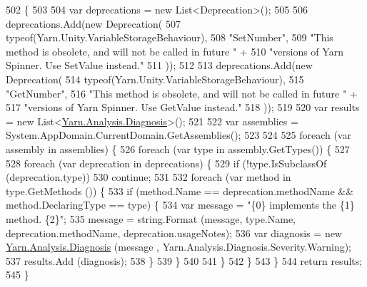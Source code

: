 \begin{DoxyCode}
502         \{
503 
504             var deprecations = \textcolor{keyword}{new} List<Deprecation>();
505 
506             deprecations.Add(\textcolor{keyword}{new} Deprecation(
507                 typeof(Yarn.Unity.VariableStorageBehaviour),
508                 \textcolor{stringliteral}{"SetNumber"},
509                 \textcolor{stringliteral}{"This method is obsolete, and will not be called in future "} +
510                 \textcolor{stringliteral}{"versions of Yarn Spinner. Use SetValue instead."}
511             ));
512 
513             deprecations.Add(\textcolor{keyword}{new} Deprecation(
514                 typeof(Yarn.Unity.VariableStorageBehaviour),
515                 \textcolor{stringliteral}{"GetNumber"},
516                 \textcolor{stringliteral}{"This method is obsolete, and will not be called in future "} +
517                 \textcolor{stringliteral}{"versions of Yarn Spinner. Use GetValue instead."}
518             ));
519 
520             var results = \textcolor{keyword}{new} List<\hyperlink{a00071}{Yarn.Analysis.Diagnosis}>();
521 
522             var assemblies = System.AppDomain.CurrentDomain.GetAssemblies();
523 
524 
525             \textcolor{keywordflow}{foreach} (var assembly \textcolor{keywordflow}{in} assemblies) \{
526                 \textcolor{keywordflow}{foreach} (var type \textcolor{keywordflow}{in} assembly.GetTypes()) \{
527 
528                     \textcolor{keywordflow}{foreach} (var deprecation \textcolor{keywordflow}{in} deprecations) \{
529                         \textcolor{keywordflow}{if} (!type.IsSubclassOf (deprecation.type))
530                             \textcolor{keywordflow}{continue};
531 
532                         \textcolor{keywordflow}{foreach} (var method \textcolor{keywordflow}{in} type.GetMethods ()) \{
533                             \textcolor{keywordflow}{if} (method.Name == deprecation.methodName && method.DeclaringType == type) \{
534                                 var message = \textcolor{stringliteral}{"\{0\} implements the \{1\} method. \{2\}"};
535                                 message = string.Format (message, type.Name, deprecation.methodName, 
      deprecation.usageNotes);
536                                 var diagnosis = \textcolor{keyword}{new} \hyperlink{a00071}{Yarn.Analysis.Diagnosis} (message
      , Yarn.Analysis.Diagnosis.Severity.Warning);
537                                 results.Add (diagnosis);
538                             \}
539                         \}
540 
541                     \}
542                 \}
543             \}
544             \textcolor{keywordflow}{return} results;
545         \}
\end{DoxyCode}
